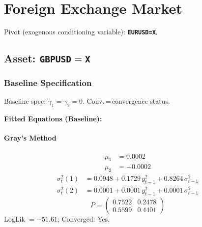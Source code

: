 \documentclass[11pt, a4paper]{article}
\begin{document}
\clearpage
\section{Foreign Exchange Market}
\noindent Pivot (exogenous conditioning variable): \textbf{\texttt{EURUSD=X}}.

\subsection{Asset: \texttt{GBPUSD$=$X}}
\subsubsection*{Baseline Specification}
\begin{table}[H]
\centering\scriptsize
\caption{GBPUSD$=$X --- Baseline Specification}
\label{tab:gbpusdx_baseline}
\smallskip
\begin{flushleft}\scriptsize Baseline spec: $\gamma_1 = \gamma_2 = 0$. Conv.\,=\,convergence status.\end{flushleft}
\end{table}

\medskip
\noindent\textbf{Fitted Equations (Baseline):}
\paragraph{Gray's Method}
\begin{align}
\mu_{1} &= 0.0002 \\
\mu_{2} &= -0.0002
\end{align}
\begin{align}
\sigma^2_{t}(1) &= 0.0948 + 0.1729\, y_{t-1}^2 + 0.8264\, \sigma^2_{t-1} \\
\sigma^2_{t}(2) &= 0.0001 + 0.0001\, y_{t-1}^2 + 0.0001\, \sigma^2_{t-1}
\end{align}
\begin{equation}
P = \begin{pmatrix} 0.7522 & 0.2478 \\ 0.5599 & 0.4401 \end{pmatrix}
\end{equation}
LogLik $= -51.61$; Converged: Yes.
\end{document}
